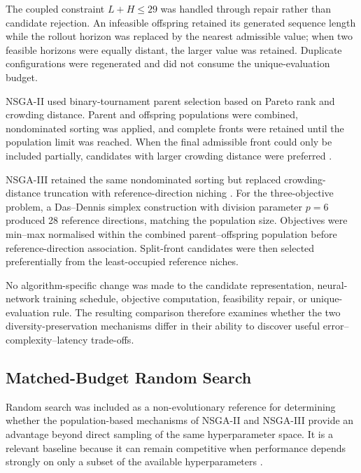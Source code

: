 \documentclass[a4paper,fleqn]{cas-sc}
\begin{document}
The coupled constraint $L+H\leq29$ was handled through repair rather than candidate rejection. An infeasible offspring retained its generated sequence length while the rollout horizon was replaced by the nearest admissible value; when two feasible horizons were equally distant, the larger value was retained. Duplicate configurations were regenerated and did not consume the unique-evaluation budget.

NSGA-II used binary-tournament parent selection based on Pareto rank and crowding distance. Parent and offspring populations were combined, nondominated sorting was applied, and complete fronts were retained until the population limit was reached. When the final admissible front could only be included partially, candidates with larger crowding distance were preferred \cite{deb2002nsga2}.

NSGA-III retained the same nondominated sorting but replaced crowding-distance truncation with reference-direction niching \cite{deb2014nsga3}. For the three-objective problem, a Das--Dennis simplex construction \cite{das1998nbi} with division parameter $p=6$ produced 28 reference directions, matching the population size. Objectives were min--max normalised within the combined parent--offspring population before reference-direction association. Split-front candidates were then selected preferentially from the least-occupied reference niches.

No algorithm-specific change was made to the candidate representation, neural-network training schedule, objective computation, feasibility repair, or unique-evaluation rule. The resulting comparison therefore examines whether the two diversity-preservation mechanisms differ in their ability to discover useful error--complexity--latency trade-offs.


\subsection{Matched-Budget Random Search}
\label{sec:random_search}

Random search was included as a non-evolutionary reference for determining whether the population-based mechanisms of NSGA-II and NSGA-III provide an advantage beyond direct sampling of the same hyperparameter space. It is a relevant baseline because it can remain competitive when performance depends strongly on only a subset of the available hyperparameters \cite{bergstra2012random}.
\end{document}
